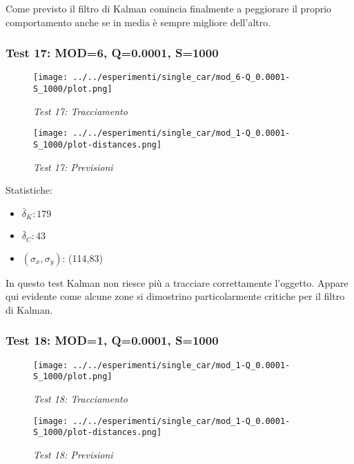 Come previsto il filtro di Kalman comincia finalmente a peggiorare il proprio comportamento anche se in media è sempre migliore dell'altro. 

\newpage
\subsubsection{Test 17: MOD=6, Q=0.0001, S=1000}

\begin{figure}[hb]
\centering
\texttt{[image: ../../esperimenti/single\_car/mod\_6-Q\_0.0001-S\_1000/plot.png]}
\caption{\textit{Test 17: Tracciamento}}
\end{figure}

\begin{figure}[hb]
\centering
\texttt{[image: ../../esperimenti/single\_car/mod\_1-Q\_0.0001-S\_1000/plot-distances.png]}
\caption{\textit{Test 17: Previsioni}}
\end{figure}

Statistiche:
\begin{itemize}
\item \begin{math} \bar \delta_K: 179 \end{math}
\item \begin{math} \bar \delta_C: 43 \end{math}
\item \begin{math}(\sigma_x,\sigma_y)\end{math}: (114,83)
\end{itemize}

In questo test Kalman non riesce più a tracciare correttamente l'oggetto. Appare qui evidente come alcune zone si dimostrino particolarmente critiche per il filtro di Kalman.

\newpage
\subsubsection{Test 18: MOD=1, Q=0.0001, S=1000}

\begin{figure}[hb]
\centering
\texttt{[image: ../../esperimenti/single\_car/mod\_1-Q\_0.0001-S\_1000/plot.png]}
\caption{\textit{Test 18: Tracciamento}}
\end{figure}

\begin{figure}[hb]
\centering
\texttt{[image: ../../esperimenti/single\_car/mod\_1-Q\_0.0001-S\_1000/plot-distances.png]}
\caption{\textit{Test 18: Previsioni}}
\end{figure}

